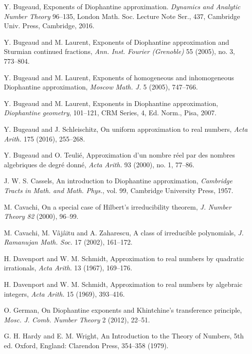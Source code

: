 \documentclass[12pt]{amsart}
\theoremstyle{definition}
\begin{document}
\begin{thebibliography}{99}
 Y. Bugeaud, Exponents of Diophantine approximation.  
{\em Dynamics and Analytic Number Theory} 96--135, 
London Math. Soc. Lecture Note Ser., 437, Cambridge Univ. Press, Cambridge, 2016. 



 Y. Bugeaud and M. Laurent, Exponents of Diophantine approximation
and Sturmian continued fractions, {\em Ann. Inst. Fourier (Grenoble)} 55 (2005), no. 3, 773--804.

 Y. Bugeaud and M. Laurent, Exponents of homogeneous and inhomogeneous Diophantine approximation,
{\em Moscow Math. J.} 5 (2005), 747--766.

 Y. Bugeaud and M. Laurent, Exponents in Diophantine approximation, 
{\em Diophantine geometry}, 101--121, CRM Series, 4, Ed. Norm., Pisa, 2007.

 Y. Bugeaud and J. Schleischitz, On uniform approximation to real numbers,
{\em Acta Arith.} 175 (2016), 255--268.

 Y. Bugeaud and O. Teuli\'{e}, Approximation d'un nombre r\'{e}el par des nombres algebriques
de degr\'{e} donn\'{e}, {\em Acta Arith.} 93 (2000), no. 1, 77--86.

 J. W. S. Cassels, An introduction to Diophantine approximation, {\em Cambridge Tracts in Math. and Math. Phys.},
vol. 99, Cambridge University Press, 1957.

  M. Cavachi,
On a special case of Hilbert’s irreducibility theorem,
{\em J. Number Theory 82} (2000), 96--99.

   M. Cavachi, M. V\^{a}j\^{a}itu and A. Zaharescu,
A class of irreducible polynomials,
{\em J. Ramanujan Math. Soc.} 17
(2002), 161--172.

 H. Davenport and W. M. Schmidt, 
Approximation to real numbers by quadratic irrationals,
{\em Acta Arith.} 13 (1967), 169--176.


 H. Davenport and W. M. Schmidt, 
Approximation to real numbers by algebraic integers, 
{\em Acta Arith.} 15 (1969), 393--416.


 O. German, On Diophantine exponents and Khintchine's transference principle, 
{\em Mosc. J. Comb. Number Theory} 2 (2012), 22--51.


 G. H. Hardy and E. M. Wright, An Introduction to the Theory of Numbers, 5th ed. Oxford, England: Clarendon Press, 354--358 (1979).


\end{thebibliography}
\end{document}
